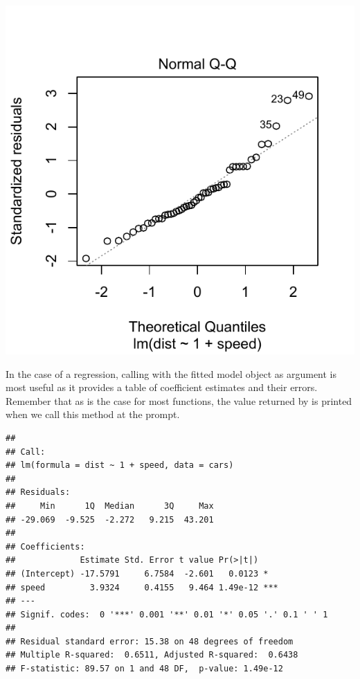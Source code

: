 \documentclass[krantz2]{krantz}\usepackage{knitr}
\begin{document}
\begin{knitrout}\footnotesize
{}\color{fgcolor}\begin{kframe}
\begin{alltt}
  \hlstd{=} \hlstd{)}
\end{alltt}
\end{kframe}

{\centering \includegraphics[width=.54\textwidth]{figure/pos-models-1a-1} 

}



\end{knitrout}

In the case of a regression, calling  with the fitted model object as argument is most useful as it provides a table of coefficient estimates and their errors. Remember that as is the case for most \Rlang functions, the value returned by  is printed when we call this method at the \Rlang prompt.

\begin{knitrout}\footnotesize
{}\color{fgcolor}\begin{kframe}
\begin{alltt}
\end{alltt}
\begin{verbatim}
## 
## Call:
## lm(formula = dist ~ 1 + speed, data = cars)
## 
## Residuals:
##     Min      1Q  Median      3Q     Max 
## -29.069  -9.525  -2.272   9.215  43.201 
## 
## Coefficients:
##             Estimate Std. Error t value Pr(>|t|)    
## (Intercept) -17.5791     6.7584  -2.601   0.0123 *  
## speed         3.9324     0.4155   9.464 1.49e-12 ***
## ---
## Signif. codes:  0 '***' 0.001 '**' 0.01 '*' 0.05 '.' 0.1 ' ' 1
## 
## Residual standard error: 15.38 on 48 degrees of freedom
## Multiple R-squared:  0.6511,	Adjusted R-squared:  0.6438 
## F-statistic: 89.57 on 1 and 48 DF,  p-value: 1.49e-12
\end{verbatim}
\end{kframe}
\end{knitrout}
\end{document}
